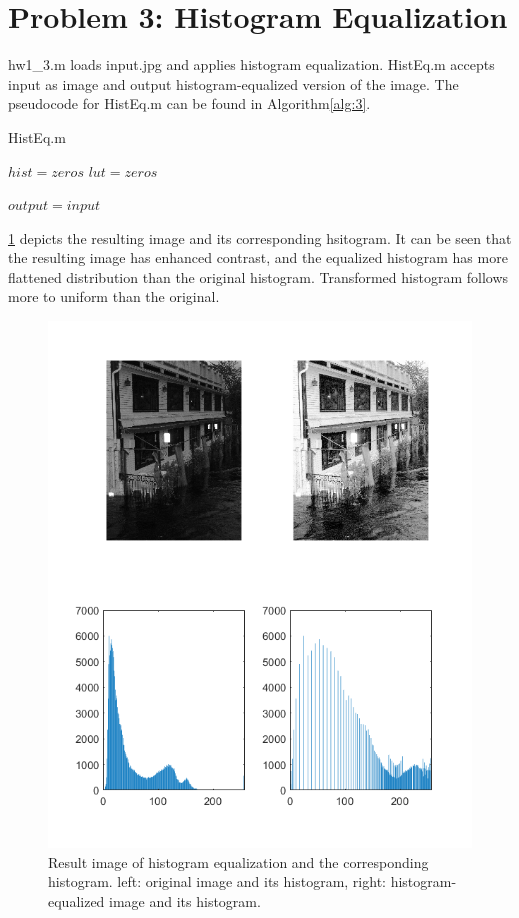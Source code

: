\documentclass[extendedabs]{bmvc2k}
\begin{document}
\section*{Problem 3: Histogram Equalization}

hw1\_3.m loads input.jpg and applies histogram equalization.
HistEq.m accepts input as image and output histogram-equalized version of the image.
The pseudocode for HistEq.m can be found in Algorithm\ref{alg:3}.

\begin{algorithm}
\caption{HistEq.m}
\label{alg:3}
$hist = zeros$\;
$lut = zeros$\;
    

$output = input$\;
\end{algorithm}

\figurename{\ref{fig:4}} depicts the resulting image and its corresponding hsitogram. 
It can be seen that the resulting image has enhanced contrast, and the equalized histogram
has more flattened distribution than the original histogram.
Transformed histogram follows more to uniform than the original. 

\begin{figure}[h]
    \centering
    \includegraphics[width=\linewidth]{hw1_3}
    \caption{Result image of histogram equalization and the corresponding histogram.
    left: original image and its histogram, right: histogram-equalized image and its histogram.}
    \label{fig:4}
    \vspace{-2mm}
\end{figure}
\end{document}
